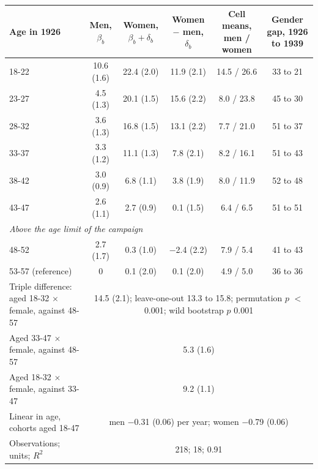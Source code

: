 \begin{tabular}{lccccc}
\toprule
Age in 1926 & Men, $\beta_b$ & Women, $\beta_b+\delta_b$ & Women $-$ men, $\delta_b$ & Cell means, men / women & Gender gap, 1926 to 1939 \\
\midrule
18-22 & 10.6 (1.6) & 22.4 (2.0) & 11.9 (2.1) & 14.5 / 26.6 & 33 to 21 \\
23-27 & 4.5 (1.3) & 20.1 (1.5) & 15.6 (2.2) & 8.0 / 23.8 & 45 to 30 \\
28-32 & 3.6 (1.3) & 16.8 (1.5) & 13.1 (2.2) & 7.7 / 21.0 & 51 to 37 \\
33-37 & 3.3 (1.2) & 11.1 (1.3) & 7.8 (2.1) & 8.2 / 16.1 & 51 to 43 \\
38-42 & 3.0 (0.9) & 6.8 (1.1) & 3.8 (1.9) & 8.0 / 11.9 & 52 to 48 \\
43-47 & 2.6 (1.1) & 2.7 (0.9) & 0.1 (1.5) & 6.4 / 6.5 & 51 to 51 \\
\multicolumn{6}{l}{\textit{Above the age limit of the campaign}} \\
48-52 & 2.7 (1.7) & 0.3 (1.0) & $-$2.4 (2.2) & 7.9 / 5.4 & 41 to 43 \\
53-57 (reference) & 0 & 0.1 (2.0) & 0.1 (2.0) & 4.9 / 5.0 & 36 to 36 \\
\midrule
Triple difference: aged 18-32 $\times$ female, against 48-57 & \multicolumn{5}{c}{14.5 (2.1); leave-one-out 13.3 to 15.8; permutation $p$ $<$0.001; wild bootstrap $p$ 0.001} \\
Aged 33-47 $\times$ female, against 48-57 & \multicolumn{5}{c}{5.3 (1.6)} \\
Aged 18-32 $\times$ female, against 33-47 & \multicolumn{5}{c}{9.2 (1.1)} \\
Linear in age, cohorts aged 18-47 & \multicolumn{5}{c}{men $-$0.31 (0.06) per year; women $-$0.79 (0.06)} \\
Observations; units; $R^2$ & \multicolumn{5}{c}{218; 18; 0.91} \\
\bottomrule
\end{tabular}

